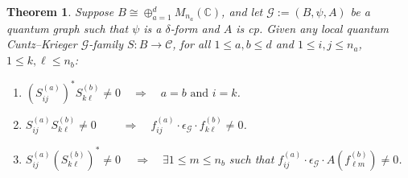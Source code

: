 \documentclass[11pt]{article}
\theoremstyle{plain}
\newtheorem{theorem}[lemma]{Theorem}
\theoremstyle{nonumberplain}
\theoremstyle{plain}
\theoremstyle{nonumberplain}
\newcommand\1{{\bf 1}}
\newcommand\bC{{\mathbb C}}
\newcommand\cG{{\mathcal G}}
\newcommand{\<}{\left\langle}
\renewcommand{\>}{\right\rangle}
\begin{document}
\begin{theorem}\label{thm:lqck_structure_theorem}
    Suppose $B\cong \oplus_{a=1}^d M_{n_a}(\bC)$, and let $\cG:=(B,\psi,A)$ be a quantum graph such that $\psi$ is a $\delta$-form and $A$ is cp. Given any local quantum Cuntz--Krieger $\cG$-family $S:B\to \mathcal{C}$, for all $1\leq a,b\leq d$ and $1\leq i,j\leq n_a$, $1\leq k,\ell\leq n_b$: 
    \begin{enumerate}
        \item $(S^{(a)}_{ij})^* S^{(b)}_{k\ell} \neq 0 
        \quad \Longrightarrow \quad 
        a=b\text{ and }i=k$.
        \item $S^{(a)}_{ij} S^{(b)}_{k\ell} \neq 0 
        \quad \quad \; \Longrightarrow \quad
        f_{ij}^{(a)}\cdot \epsilon_\cG\cdot f_{k\ell}^{(b)}\neq 0$.
        \item $S^{(a)}_{ij} (S^{(b)}_{k\ell})^* \neq 0 
        \quad \,\Longrightarrow \quad
        \exists 1\leq m\leq n_b$ such that $f_{ij}^{(a)}\cdot \epsilon_\cG\cdot A(f_{\ell m}^{(b)}) \neq 0$. 
    \end{enumerate}
\end{theorem}

\end{document}
